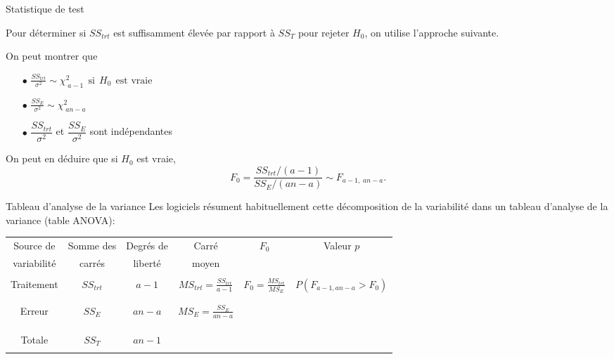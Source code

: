 \documentclass{BeamerTemplate}
\begin{document}
\begin{frame}[t]{Statistique de test}

{\small
Pour déterminer si $SS_{trt}$ est suffisamment élevée par rapport à $SS_T$ pour rejeter $H_0$, on
utilise l'approche suivante.

On peut montrer que
\begin{itemize}\itemsep0.2cm
\item[$\bullet$]$\displaystyle\frac{SS_{trt}}{\sigma^2} \sim \chi_{\;a-1}^2~~ \mbox{si} ~~H_0~~\mbox{est vraie}$
\item[$\bullet$]%
 $\displaystyle\frac{SS_E}{\sigma^2} \sim \chi_{\;an-a}^2$
\item[$\bullet$] $\dfrac{SS_{trt}}{\sigma^2}$ et $\dfrac{SS_{E}}{\sigma^2}$ sont indépendantes
\end{itemize}
 \vspace{0.3cm}

\medskip
On peut en déduire que si $H_0$ est vraie,
$$ F_0=\frac{SS_{trt}/(a-1)}{SS_E/(an-a)}\sim F_{a-1,\;an-a}. $$
}
\end{frame}

\begin{frame}[t]{Tableau d'analyse de la variance}
Les logiciels résument habituellement cette décomposition de la variabilité dans
un \alert{tableau d'analyse de la variance} (table ANOVA):

\bigskip



\begin{tabular}{cccccc}\hline
Source de & Somme des & Degrés de & Carré & $\quad F_0\quad $ & Valeur $p$ \\
variabilité & carrés & liberté & moyen & & \\ \hline
\\
Traitement & $SS_{trt}$ & $a-1$ & $MS_{trt}=\frac{SS_{trt}}{a-1}$ & $F_0=\frac{MS_{trt}}{MS_E}$ & {\scriptsize $P(F_{a-1,an-a}>F_0)$}
\\ \\ \\
Erreur & $SS_E$ & $an-a$ & $MS_E=\frac{SS_E}{an-a}$ & &
\\ \\ \\\hline \\
Totale & $SS_T$ & $an-1$ & & & \\ \\\hline
\end{tabular}


\end{frame}
\end{document}
